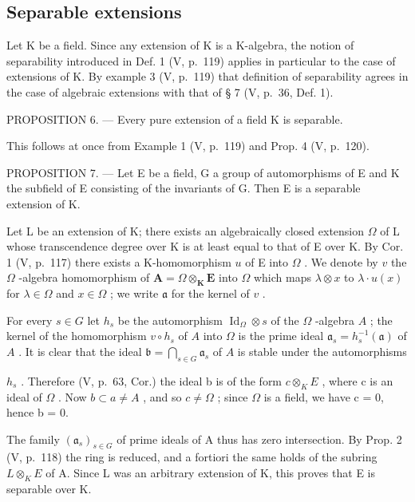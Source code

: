 \subsection{Separable extensions}

Let K be a field. Since any extension of K is a K-algebra, the notion of separability introduced in Def. 1 (V, p.~119) applies in particular to the case of extensions of K. By example 3 (V, p.~119) that definition of separability agrees in the case of algebraic extensions with that of § 7 (V, p.~36, Def. 1).

PROPOSITION 6. --- Every pure extension of a field K is separable.

This follows at once from Example 1 (V, p.~119) and Prop. 4 (V, p.~120).

PROPOSITION 7. --- Let E be a field, G a group of automorphisms of E and K the subfield of E consisting of the invariants of G. Then E is a separable extension of K.

Let L be an extension of K; there exists an algebraically closed extension \(\Omega\) of L whose transcendence degree over K is at least equal to that of E over K. By Cor. 1 (V, p.~117) there exists a K-homomorphism \(u\) of E into \(\Omega\) . We denote by \(v\) the \(\Omega\) -algebra homomorphism of \(\mathbf{A} = \Omega \otimes_{\mathbf{K}} \mathbf{E}\) into \(\Omega\) which maps \(\lambda \otimes x\) to \(\lambda \cdot u(x)\) for \(\lambda \in \Omega\) and \(x \in \Omega\) ; we write \(\mathfrak{a}\) for the kernel of \(v\) .

For every \(s \in G\) let \(h_s\) be the automorphism \(\operatorname{Id}_{\Omega} \otimes s\) of the \(\Omega\) -algebra \(A\) ; the kernel of the homomorphism \(v \circ h_s\) of \(A\) into \(\Omega\) is the prime ideal \(\mathfrak{a}_s = h_s^{-1}(\mathfrak{a})\) of \(A\) . It is clear that the ideal \(\mathfrak{b} = \bigcap_{s \in G} \mathfrak{a}_s\) of \(A\) is stable under the automorphisms

\(h_{s}\) . Therefore (V, p.~63, Cor.) the ideal b is of the form \(c \otimes_{K} E\) , where c is an ideal of \(\Omega\) . Now \(b \subset a \neq A\) , and so \(c \neq \Omega\) ; since \(\Omega\) is a field, we have c = 0, hence b = 0.

The family \((\mathfrak{a}_{s})_{s\in G}\) of prime ideals of A thus has zero intersection. By Prop. 2 (V, p.~118) the ring is reduced, and a fortiori the same holds of the subring \(L\otimes_{K}E\) of A. Since L was an arbitrary extension of K, this proves that E is separable over K.

